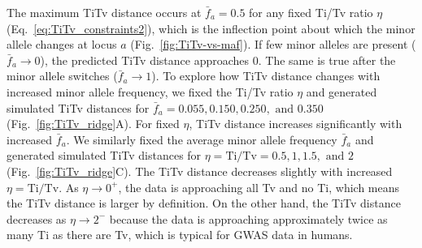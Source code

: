 \documentclass[aos]{imsart}
\begin{document}
The maximum TiTv distance occurs at $\bar{f}_a=0.5$ for any fixed Ti/Tv ratio $\eta$ (Eq.~\ref{eq:TiTv_constraints2}), which is the inflection point about which the minor allele changes at locus $a$ (Fig.~\ref{fig:TiTv-vs-maf}). If few minor alleles are present ($\bar{f}_a \to 0$), the predicted TiTv distance approaches 0. The same is true after the minor allele switches ($\bar{f}_a \to 1$). To explore how TiTv distance changes with increased minor allele frequency, we fixed the Ti/Tv ratio $\eta$ and generated simulated TiTv distances for $\bar{f}_a = 0.055, 0.150, 0.250, \text{ and } 0.350$ (Fig.~\ref{fig:TiTv_ridge}A). For fixed $\eta$, TiTv distance increases significantly with increased $\bar{f}_a$. We similarly fixed the average minor allele frequency $\bar{f}_a$ and generated simulated TiTv distances for $\eta = \text{Ti/Tv} = 0.5, 1, 1.5, \text{ and } 2$ (Fig.~\ref{fig:TiTv_ridge}C). The TiTv distance decreases slightly with increased $\eta = \text{Ti/Tv}$. As $\eta \to 0^+$, the data is approaching all Tv and no Ti, which means the TiTv distance is larger by definition. On the other hand, the TiTv distance decreases as $\eta \to 2^-$ because the data is approaching approximately twice as many Ti as there are Tv, which is typical for GWAS data in humans.
\end{document}
